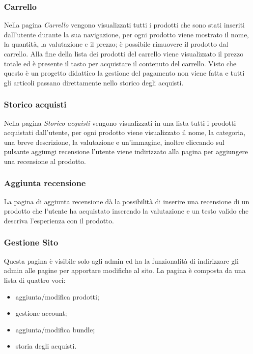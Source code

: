 \subsubsection{Carrello}
Nella pagina \emph{Carrello} vengono visualizzati tutti i prodotti che sono stati inseriti dall'utente durante la sua navigazione, per ogni prodotto viene mostrato il nome, la quantità, la valutazione e il prezzo; è possibile rimuovere il prodotto dal carrello.\newline
Alla fine della lista dei prodotti del carrello viene visualizzato il prezzo totale ed è presente il tasto per acquistare il contenuto del carrello.\newline
 Visto che questo è un progetto didattico la gestione del pagamento non viene fatta e tutti gli articoli passano direttamente nello storico degli acquisti.

\subsubsection{Storico acquisti}
Nella pagina \emph{Storico acquisti} vengono visualizzati in una lista tutti i prodotti acquistati dall'utente, per ogni prodotto viene visualizzato il nome, la categoria, una breve descrizione, la valutazione e un'immagine, inoltre cliccando sul pulsante aggiungi recensione l'utente viene indirizzato alla pagina per aggiungere una recensione al prodotto.

\subsubsection{Aggiunta recensione}
La pagina di aggiunta recensione dà la possibilità di inserire una recensione di un prodotto che l'utente ha acquistato inserendo la valutazione e un testo valido che descriva l'esperienza con il prodotto.

\subsubsection{Gestione Sito}
Questa pagina è visibile solo agli admin ed ha la funzionalità di indirizzare gli admin alle pagine per apportare modifiche al sito.\newline
 La pagina è composta da una lista di quattro voci:
\begin{itemize}
	\item aggiunta/modifica prodotti;
	\item gestione account;
	\item aggiunta/modifica bundle;
	\item storia degli acquisti.
\end{itemize}

